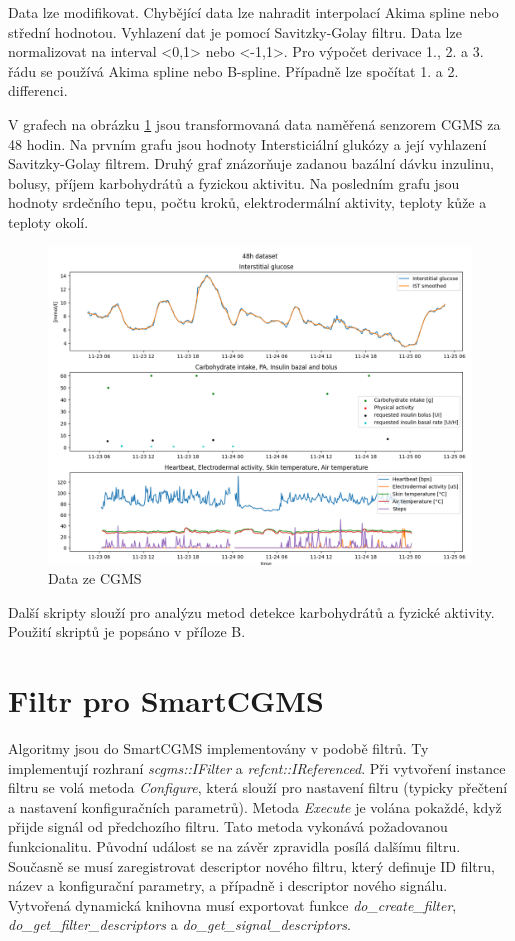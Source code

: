 Data lze modifikovat. Chybějící data lze nahradit interpolací Akima spline\citep{cho.akima} nebo střední hodnotou. Vyhlazení dat je pomocí Savitzky-Golay filtru. Data lze normalizovat na interval <0,1> nebo <-1,1>. Pro výpočet derivace 1., 2. a 3. řádu se používá Akima spline nebo B-spline. Případně lze spočítat 1. a 2. differenci.

V grafech na obrázku \ref{fig:48h_dataset} jsou transformovaná data naměřená senzorem CGMS za 48 hodin. Na prvním grafu jsou hodnoty Intersticiální glukózy a její vyhlazení Savitzky-Golay filtrem. Druhý graf znázorňuje zadanou bazální dávku inzulinu, bolusy, příjem karbohydrátů a fyzickou aktivitu. Na posledním grafu jsou hodnoty srdečního tepu, počtu kroků, elektrodermální aktivity, teploty kůže a teploty okolí.

\begin{figure}[H]
\caption{Data ze CGMS}
\label{fig:48h_dataset}
\centering
\includegraphics[width=1\textwidth]{img/cho/48h_dataset.png}
\end{figure}

Další skripty slouží pro analýzu metod detekce karbohydrátů a fyzické aktivity. Použití skriptů je popsáno v příloze B.


\section{Filtr pro SmartCGMS}

Algoritmy jsou do SmartCGMS implementovány v podobě filtrů. Ty implementují rozhraní \textit{scgms::IFilter} a \textit{refcnt::IReferenced}. Při vytvoření instance filtru se volá metoda \textit{Configure}, která slouží pro nastavení filtru (typicky přečtení a nastavení konfiguračních parametrů). Metoda \textit{Execute} je volána pokaždé, když přijde signál od předchozího filtru. Tato metoda vykonává požadovanou funkcionalitu. Původní událost se na závěr zpravidla posílá dalšímu filtru. Současně se musí zaregistrovat descriptor nového filtru, který definuje ID filtru, název a konfigurační parametry, a případně i descriptor nového signálu. Vytvořená dynamická knihovna musí exportovat funkce \textit{do\_create\_filter}, \textit{do\_get\_filter\_descriptors} a \textit{do\_get\_signal\_descriptors}.


